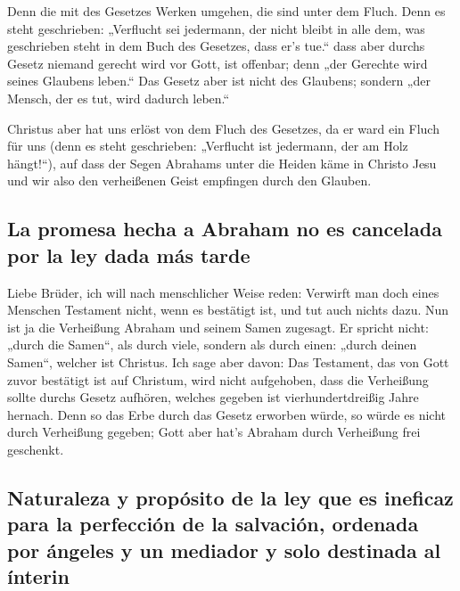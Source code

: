  Denn die mit des Gesetzes Werken umgehen, die sind unter
dem Fluch. Denn es steht geschrieben: „Verflucht sei jedermann, der
nicht bleibt in alle dem, was geschrieben steht in dem Buch des
Gesetzes, dass er's tue.``  dass aber durchs Gesetz
niemand gerecht wird vor Gott, ist offenbar; denn „der Gerechte wird
seines Glaubens leben.``  Das Gesetz aber ist nicht des
Glaubens; sondern „der Mensch, der es tut, wird dadurch leben.``

 Christus aber hat uns erlöst von dem Fluch des Gesetzes,
da er ward ein Fluch für uns (denn es steht geschrieben: „Verflucht ist
jedermann, der am Holz hängt!{}``),  auf dass der Segen
Abrahams unter die Heiden käme in Christo Jesu und wir also den
verheißenen Geist empfingen durch den Glauben.

\hypertarget{la-promesa-hecha-a-abraham-no-es-cancelada-por-la-ley-dada-muxe1s-tarde}{%
\subsection{La promesa hecha a Abraham no es cancelada por la ley dada
más
tarde}\label{la-promesa-hecha-a-abraham-no-es-cancelada-por-la-ley-dada-muxe1s-tarde}}

 Liebe Brüder, ich will nach menschlicher Weise reden:
Verwirft man doch eines Menschen Testament nicht, wenn es bestätigt ist,
und tut auch nichts dazu.  Nun ist ja die Verheißung
Abraham und seinem Samen zugesagt. Er spricht nicht: „durch die Samen``,
als durch viele, sondern als durch einen: „durch deinen Samen``, welcher
ist Christus.  Ich sage aber davon: Das Testament, das
von Gott zuvor bestätigt ist auf Christum, wird nicht aufgehoben, dass
die Verheißung sollte durchs Gesetz aufhören, welches gegeben ist
vierhundertdreißig Jahre hernach.  Denn so das Erbe durch
das Gesetz erworben würde, so würde es nicht durch Verheißung gegeben;
Gott aber hat's Abraham durch Verheißung frei geschenkt.

\hypertarget{naturaleza-y-propuxf3sito-de-la-ley-que-es-ineficaz-para-la-perfecciuxf3n-de-la-salvaciuxf3n-ordenada-por-uxe1ngeles-y-un-mediador-y-solo-destinada-al-uxednterin}{%
\subsection{Naturaleza y propósito de la ley que es ineficaz para la
perfección de la salvación, ordenada por ángeles y un mediador y solo
destinada al
ínterin}\label{naturaleza-y-propuxf3sito-de-la-ley-que-es-ineficaz-para-la-perfecciuxf3n-de-la-salvaciuxf3n-ordenada-por-uxe1ngeles-y-un-mediador-y-solo-destinada-al-uxednterin}}

